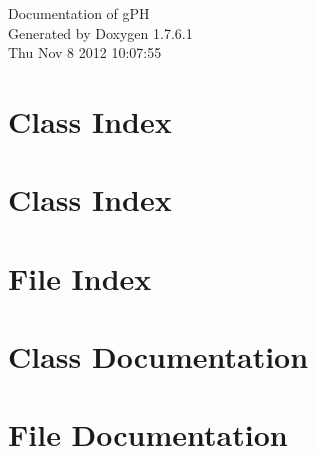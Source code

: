 \documentclass[a4paper]{book}
\begin{document}
\hypersetup{pageanchor=false,citecolor=blue}
\begin{titlepage}
\vspace*{7cm}
\begin{center}
{\Large \-Documentation of g\-P\-H }\\
\vspace*{1cm}
{\large \-Generated by Doxygen 1.7.6.1}\\
\vspace*{0.5cm}
{\small Thu Nov 8 2012 10:07:55}\\
\end{center}
\end{titlepage}
\clearemptydoublepage
{}
\tableofcontents
\clearemptydoublepage
{}
\hypersetup{pageanchor=true,citecolor=blue}
\chapter{\-Class \-Index}

\chapter{\-Class \-Index}

\chapter{\-File \-Index}

\chapter{\-Class \-Documentation}































\chapter{\-File \-Documentation}



















\printindex
\end{document}
